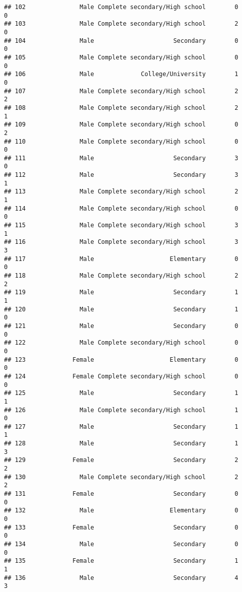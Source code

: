 \documentclass[
]{article}
\begin{document}
\begin{verbatim}
## 102               Male Complete secondary/High school        0        0
## 103               Male Complete secondary/High school        2        0
## 104               Male                      Secondary        0        0
## 105               Male Complete secondary/High school        0        0
## 106               Male             College/University        1        0
## 107               Male Complete secondary/High school        2        2
## 108               Male Complete secondary/High school        2        1
## 109               Male Complete secondary/High school        0        2
## 110               Male Complete secondary/High school        0        0
## 111               Male                      Secondary        3        0
## 112               Male                      Secondary        3        1
## 113               Male Complete secondary/High school        2        1
## 114               Male Complete secondary/High school        0        0
## 115               Male Complete secondary/High school        3        1
## 116               Male Complete secondary/High school        3        3
## 117               Male                     Elementary        0        0
## 118               Male Complete secondary/High school        2        2
## 119               Male                      Secondary        1        1
## 120               Male                      Secondary        1        0
## 121               Male                      Secondary        0        0
## 122               Male Complete secondary/High school        0        0
## 123             Female                     Elementary        0        0
## 124             Female Complete secondary/High school        0        0
## 125               Male                      Secondary        1        1
## 126               Male Complete secondary/High school        1        0
## 127               Male                      Secondary        1        1
## 128               Male                      Secondary        1        3
## 129             Female                      Secondary        2        2
## 130               Male Complete secondary/High school        2        2
## 131             Female                      Secondary        0        0
## 132               Male                     Elementary        0        0
## 133             Female                      Secondary        0        0
## 134               Male                      Secondary        0        0
## 135             Female                      Secondary        1        1
## 136               Male                      Secondary        4        3

\end{verbatim}
\end{document}
